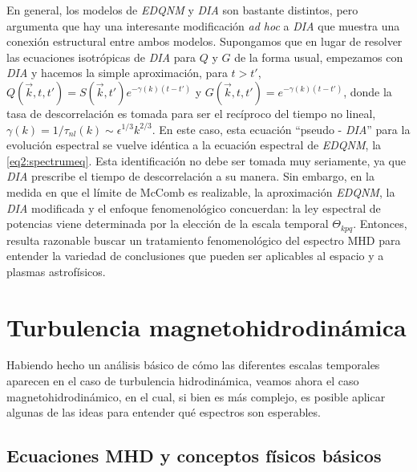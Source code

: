 En general, los modelos de \textit{EDQNM} y \textit{DIA} son bastante
distintos, pero \cite{mccomb_physics_1990} argumenta que hay una
interesante modificación \textit{ad hoc} a \textit{DIA} que muestra
una conexión estructural entre ambos modelos. Supongamos que en lugar
de resolver las ecuaciones isotrópicas de \textit{DIA} para $Q$ y $G$
de la forma usual, empezamos con \textit{DIA} y hacemos la simple
aproximación, para $t>t'$, $Q(\vec{k}, t, t') = S(\vec{k}, t')
e^{-\gamma(k) (t-t')}$ y $G(\vec{k}, t, t') = e^{-\gamma(k)(t-t')}$,
donde la tasa de descorrelación es tomada para ser el recíproco del
tiempo no lineal, $\gamma(k) = 1/\tau_{nl}(k) \sim \epsilon^{1/3}
k^{2/3}$. En este caso, esta ecuación ``pseudo - \textit{DIA}'' para
la evolución espectral se vuelve idéntica a la ecuación espectral de
\textit{EDQNM}, la \cref{eq2:spectrumeq}. Esta identificación no debe
ser tomada muy seriamente, ya que \textit{DIA} prescribe el tiempo de
descorrelación a su manera. Sin embargo, en la medida en que el límite
de McComb es realizable, la aproximación \textit{EDQNM}, la
\textit{DIA} modificada y el enfoque fenomenológico concuerdan: la ley
espectral de potencias viene determinada por la elección de la escala
temporal $\Theta_{kpq}$. Entonces, resulta razonable buscar un
tratamiento fenomenológico del espectro MHD para entender la variedad
de conclusiones que pueden ser aplicables al espacio y a plasmas
astrofísicos.




\section{Turbulencia magnetohidrodinámica}\label{sec:FundTurbulenciaMHD}

Habiendo hecho un análisis básico de cómo las diferentes escalas
temporales aparecen en el caso de turbulencia hidrodinámica, veamos
ahora el caso magnetohidrodinámico, en el cual, si bien es más
complejo, es posible aplicar algunas de las ideas para entender qué
espectros son esperables.

\subsection{Ecuaciones MHD y conceptos físicos básicos}

